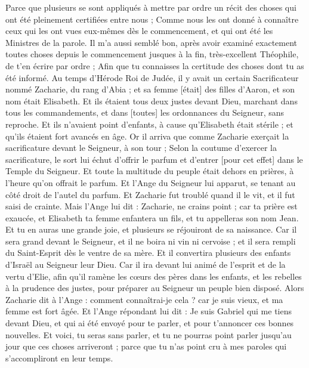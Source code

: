 \BFont
\begin{multicols}{2}
\VerseOne{}Parce que plusieurs se sont appliqués à mettre par ordre un récit des choses qui ont été pleinement certifiées entre nous ;
Comme nous les ont donné à connaître ceux qui les ont vues eux-mêmes dès le commencement, et qui ont été les Ministres de la parole.
Il m'a aussi semblé bon, après avoir examiné exactement toutes choses depuis le commencement jusques à la fin, très-excellent Théophile, de t'en écrire par ordre ;
Afin que tu connaisses la certitude des choses dont tu as été informé.
Au temps d'Hérode Roi de Judée, il y avait un certain Sacrificateur nommé Zacharie, du rang d'Abia ; et sa femme [était] des filles d'Aaron, et son nom était Elisabeth.
Et ils étaient tous deux justes devant Dieu, marchant dans tous les commandements, et dans [toutes] les ordonnances du Seigneur, sans reproche.
Et ils n'avaient point d'enfants, à cause qu'Elisabeth était stérile ; et qu'ils étaient fort avancés en âge.
Or il arriva que comme Zacharie exerçait la sacrificature devant le Seigneur, à son tour ;
Selon la coutume d'exercer la sacrificature, le sort lui échut d'offrir le parfum et d'entrer [pour cet effet] dans le Temple du Seigneur.
Et toute la multitude du peuple était dehors en prières, à l'heure qu'on offrait le parfum.
Et l'Ange du Seigneur lui apparut, se tenant au côté droit de l'autel du parfum.
Et Zacharie fut troublé quand il le vit, et il fut saisi de crainte.
Mais l'Ange lui dit : Zacharie, ne crains point ; car ta prière est exaucée, et Elisabeth ta femme enfantera un fils, et tu appelleras son nom Jean.
Et tu en auras une grande joie, et plusieurs se réjouiront de sa naissance.
Car il sera grand devant le Seigneur, et il ne boira ni vin ni cervoise ; et il sera rempli du Saint-Esprit dès le ventre de sa mère.
Et il convertira plusieurs des enfants d'Israël au Seigneur leur Dieu.
Car il ira devant lui animé de l'esprit et de la vertu d'Elie, afin qu'il ramène les cœurs des pères dans les enfants, et les rebelles à la prudence des justes, pour préparer au Seigneur un peuple bien disposé.
Alors Zacharie dit à l'Ange : comment connaîtrai-je cela ? car je suis vieux, et ma femme est fort âgée.
Et l'Ange répondant lui dit : Je suis Gabriel qui me tiens devant Dieu, et qui ai été envoyé pour te parler, et pour t'annoncer ces bonnes nouvelles.
Et voici, tu seras sans parler, et tu ne pourras point parler jusqu'au jour que ces choses arriveront ; parce que tu n'as point cru à mes paroles qui s'accompliront en leur temps.

\end{multicols}
